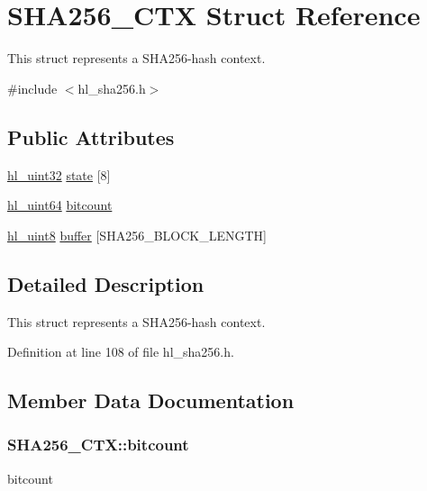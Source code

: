 \hypertarget{struct_s_h_a256___c_t_x}{
\section{SHA256\_\-CTX Struct Reference}
\label{struct_s_h_a256___c_t_x}
}


This struct represents a SHA256-\/hash context.  


{\ttfamily \#include $<$hl\_\-sha256.h$>$}\subsection*{Public Attributes}
\begin{DoxyCompactItemize}
\item 
\hyperlink{hl__types_8h_ae2fe08a06e4f429c5519ec9865f304d6}{hl\_\-uint32} \hyperlink{struct_s_h_a256___c_t_x_a0a537d66d075486a6e35b21f9b8b16c3}{state} \mbox{[}8\mbox{]}
\item 
\hyperlink{hl__types_8h_acab20cc881134266c8bb4c3d27e1c906}{hl\_\-uint64} \hyperlink{struct_s_h_a256___c_t_x_a8031a880b131a73be00f1aaae1a94f4e}{bitcount}
\item 
\hyperlink{hl__types_8h_adc1917ae5f0dc40725be12536ffe0a6c}{hl\_\-uint8} \hyperlink{struct_s_h_a256___c_t_x_afdec8b9d90f712d82d60415e61b0ac5f}{buffer} \mbox{[}SHA256\_\-BLOCK\_\-LENGTH\mbox{]}
\end{DoxyCompactItemize}


\subsection{Detailed Description}
This struct represents a SHA256-\/hash context. 

Definition at line 108 of file hl\_\-sha256.h.

\subsection{Member Data Documentation}
\hypertarget{struct_s_h_a256___c_t_x_a8031a880b131a73be00f1aaae1a94f4e}{
\subsubsection[{bitcount}]{ {\bf SHA256\_\-CTX::bitcount}}}
\label{struct_s_h_a256___c_t_x_a8031a880b131a73be00f1aaae1a94f4e}
bitcount 

